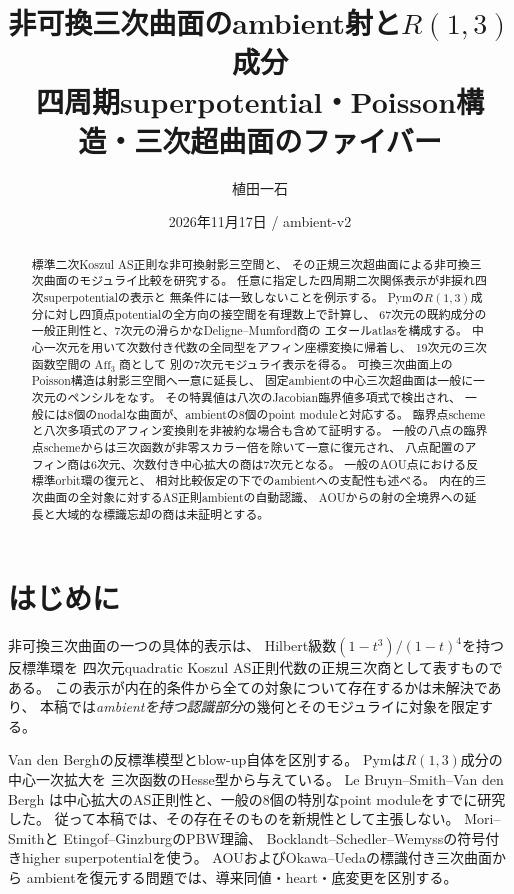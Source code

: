 \documentclass[11pt,a4paper]{ltjsarticle}
\title{非可換三次曲面のambient射と$R(1,3)$成分\\\large 四周期superpotential・Poisson構造・三次超曲面のファイバー}
\author{植田一石}
\date{2026年11月17日 / ambient-v2}
\theoremstyle{definition}\newtheorem{remark}[theorem]{注意}
\begin{document}
\maketitle
\begin{abstract}
標準二次Koszul AS正則な非可換射影三空間と、
その正規三次超曲面による非可換三次曲面のモジュライ比較を研究する。
任意に指定した四周期二次関係表示が非捩れ四次superpotentialの表示と
無条件には一致しないことを例示する。
Pymの$R(1,3)$成分に対し四頂点potentialの全方向の接空間を有理数上で計算し、
67次元の既約成分の一般正則性と、7次元の滑らかなDeligne--Mumford商の
エタールatlasを構成する。
中心一次元を用いて次数付き代数の全同型をアフィン座標変換に帰着し、
19次元の三次函数空間の$\operatorname{Aff}_3$商として
別の7次元モジュライ表示を得る。
可換三次曲面上のPoisson構造は射影三空間へ一意に延長し、
固定ambientの中心三次超曲面は一般に一次元のペンシルをなす。
その特異値は八次のJacobian臨界値多項式で検出され、
一般には8個のnodalな曲面が、ambientの8個のpoint moduleと対応する。
臨界点schemeと八次多項式のアフィン変換則を非被約な場合も含めて証明する。
一般の八点の臨界点schemeからは三次函数が非零スカラー倍を除いて一意に復元され、
八点配置のアフィン商は6次元、次数付き中心拡大の商は7次元となる。
一般のAOU点における反標準orbit環の復元と、
相対比較仮定の下でのambientへの支配性も述べる。
内在的三次曲面の全対象に対するAS正則ambientの自動認識、
AOUからの射の全境界への延長と大域的な標識忘却の商は未証明とする。
\end{abstract}
{\small\tableofcontents}
\clearpage

\section{はじめに}
非可換三次曲面の一つの具体的表示は、
Hilbert級数$(1-t^3)/(1-t)^4$を持つ反標準環を
四次元quadratic Koszul AS正則代数の正規三次商として表すものである。
この表示が内在的条件から全ての対象について存在するかは未解決であり、
本稿では\emph{ambientを持つ認識部分}の幾何とそのモジュライに対象を限定する。

Van den Bergh\cite[Chapter 12]{VdB}の反標準模型とblow-up自体を区別する。
Pym\cite[\S3.4]{Pym}は$R(1,3)$成分の中心一次拡大を
三次函数のHesse型から与えている。
Le Bruyn--Smith--Van den Bergh\cite[\S3, Propositions 4.3.7, 4.3.9]{LBS}
は中心拡大のAS正則性と、一般の8個の特別なpoint moduleをすでに研究した。
従って本稿では、その存在そのものを新規性として主張しない。
Mori--Smith\cite{MS}と
Etingof--Ginzburg\cite{EG}のPBW理論、
Bocklandt--Schedler--Wemyss\cite{BSW}の符号付きhigher superpotentialを使う。
AOU\cite{AOU}およびOkawa--Ueda\cite{OU2025}の標識付き三次曲面から
ambientを復元する問題では、導来同値・heart・底変更を区別する。
\end{document}
